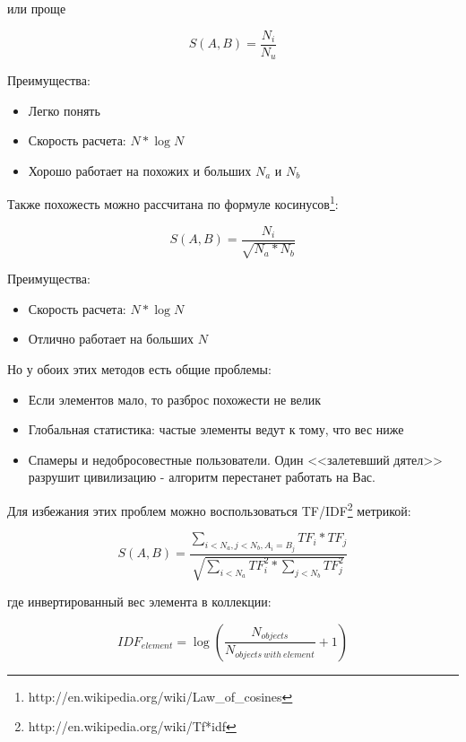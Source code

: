 или проще

\begin{equation}
 \label{eq:smlar2}
 S(A,B) = \frac{N_{i}}{N_{u}}
\end{equation}

Преимущества:

\begin{itemize}
\item Легко понять
\item Скорость расчета: $N * \log{N}$
\item Хорошо работает на похожих и больших $N_a$ и $N_b$
\end{itemize}

Также похожесть можно рассчитана по формуле косинусов\footnote{http://en.wikipedia.org/wiki/Law\_of\_cosines}:

\begin{equation}
 \label{eq:smlar3}
 S(A,B) = \frac{N_{i}}{\sqrt{N_{a}*N_{b}}}
\end{equation}

Преимущества:

\begin{itemize}
\item Скорость расчета: $N * \log{N}$
\item Отлично работает на больших $N$
\end{itemize}

Но у обоих этих методов есть общие проблемы:

\begin{itemize}
\item Если элементов мало, то разброс похожести не велик
\item Глобальная статистика: частые элементы ведут к тому, что вес ниже
\item Спамеры и недобросовестные пользователи. Один <<залетевший дятел>> разрушит цивилизацию - алгоритм перестанет работать на Вас.
\end{itemize}

Для избежания этих проблем можно воспользоваться TF/IDF\footnote{http://en.wikipedia.org/wiki/Tf*idf} метрикой:

\begin{equation}
 \label{eq:smlar4}
 S(A,B) = \frac{\sum_{i < N_{a}, j < N_{b}, A_{i} = B_{j}}TF_{i} * TF_{j}}{\sqrt{\sum_{i < N_{a}}TF_{i}^{2} * \sum_{j < N_{b}}TF_{j}^{2}}}
\end{equation}

где инвертированный вес элемента в коллекции:

\begin{equation}
 \label{eq:smlar5}
 IDF_{element} = \log{(\frac{N_{objects}}{N_{objects\ with\ element}} + 1)}
\end{equation}

